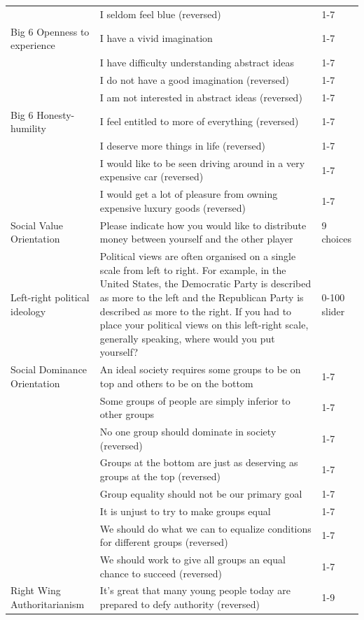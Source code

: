\documentclass[
  man, donotrepeattitle,floatsintext]{apa6}
\newenvironment{lltable}{\begin{landscape}\centering\begin{ThreePartTable}}{\end{ThreePartTable}\end{landscape}}
\begin{document}
\begin{lltable}
\begin{longtable}{p{6cm}p{11cm}p{3cm}}
 & I seldom feel blue (reversed) & 1-7\\
Big 6 Openness to experience & I have a vivid imagination & 1-7\\
 & I have difficulty understanding abstract ideas & 1-7\\
 & I do not have a good imagination (reversed) & 1-7\\
 & I am not interested in abstract ideas (reversed) & 1-7\\
Big 6 Honesty-humility & I feel entitled to more of everything (reversed) & 1-7\\
 & I deserve more things in life (reversed) & 1-7\\
 & I would like to be seen driving around in a very expensive car (reversed) & 1-7\\
 & I would get a lot of pleasure from owning expensive luxury goods (reversed) & 1-7\\
Social Value Orientation & Please indicate how you would like to distribute money between yourself and the other player & 9 choices\\
Left-right political ideology & Political views are often organised on a single scale from left to right. For example, in the United States, the Democratic Party is described as more to the left and the Republican Party is described as more to the right. If you had to place your political views on this left-right scale, generally speaking, where would you put yourself? & 0-100 slider\\
Social Dominance Orientation & An ideal society requires some groups to be on top and others to be on the bottom & 1-7\\
 & Some groups of people are simply inferior to other groups & 1-7\\
 & No one group should dominate in society (reversed) & 1-7\\
 & Groups at the bottom are just as deserving as groups at the top (reversed) & 1-7\\
 & Group equality should not be our primary goal & 1-7\\
 & It is unjust to try to make groups equal & 1-7\\
 & We should do what we can to equalize conditions for different groups (reversed) & 1-7\\
 & We should work to give all groups an equal chance to succeed (reversed) & 1-7\\
Right Wing Authoritarianism & It's great that many young people today are prepared to defy authority (reversed) & 1-9\\

\end{longtable}
\end{lltable}
\end{document}
